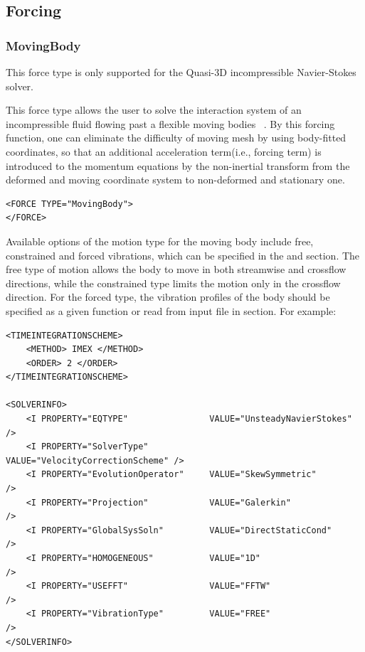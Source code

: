 \subsection{Forcing}
\subsubsection{MovingBody}\label{s:forcing:MovingBody}

\begin{notebox}
This force type is only supported for the Quasi-3D incompressible Navier-Stokes solver.
\end{notebox}

This force type allows the user to solve the interaction system of an incompressible fluid flowing past a flexible moving bodies ~\cite{NeKa97}. By this forcing function, one can eliminate the difficulty of moving mesh by using body-fitted coordinates, so that an additional acceleration term(i.e., forcing term) is introduced to the momentum equations by the non-inertial transform from the deformed and moving coordinate system to non-deformed and stationary one.

\begin{lstlisting}[style=XMLStyle]
<FORCE TYPE="MovingBody">
</FORCE>
\end{lstlisting}

Available options of the motion type for the moving body include free,
constrained and forced vibrations, which can be specified in the
 and  section. The free
type of motion allows the body to move in both streamwise and
crossflow directions, while the constrained type limits the motion
only in the crossflow direction. For the forced type, the vibration
profiles of the body should be specified as a given function or read
from input file in  section. For example:

\begin{lstlisting}[style=XMLStyle]
<TIMEINTEGRATIONSCHEME>
    <METHOD> IMEX </METHOD>
    <ORDER> 2 </ORDER>
</TIMEINTEGRATIONSCHEME>

<SOLVERINFO>
    <I PROPERTY="EQTYPE"                VALUE="UnsteadyNavierStokes"     />
    <I PROPERTY="SolverType"            VALUE="VelocityCorrectionScheme" />
    <I PROPERTY="EvolutionOperator"     VALUE="SkewSymmetric"            />
    <I PROPERTY="Projection"            VALUE="Galerkin"                 />
    <I PROPERTY="GlobalSysSoln"         VALUE="DirectStaticCond"         />
    <I PROPERTY="HOMOGENEOUS"           VALUE="1D"                       />
    <I PROPERTY="USEFFT"                VALUE="FFTW"                     />
    <I PROPERTY="VibrationType"         VALUE="FREE"                     />
</SOLVERINFO>
\end{lstlisting}

